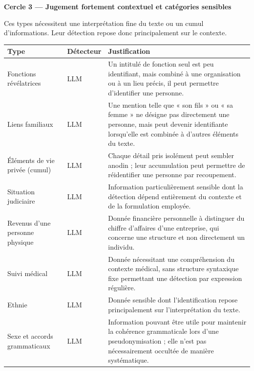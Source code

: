 \documentclass[12pt,a4paper]{article}
\begin{document}
\medskip
\noindent\textbf{Cercle 3 --- Jugement fortement contextuel et catégories sensibles}

\smallskip

Ces types nécessitent une interprétation fine du texte ou un cumul
d'informations. Leur détection repose donc principalement sur le contexte.

\begin{longtable}{
    p{3.2cm}
    @{\hspace{0.4cm}}
    p{1.8cm}
    @{\hspace{0.4cm}}
    p{8.5cm}
}
\toprule
\textbf{Type} & \textbf{Détecteur} & \textbf{Justification} \\
\midrule
\endhead

Fonctions révélatrices
& LLM
& Un intitulé de fonction seul est peu identifiant, mais combiné à une
organisation ou à un lieu précis, il peut permettre d'identifier une personne. \\

Liens familiaux
& LLM
& Une mention telle que « son fils » ou « sa femme » ne désigne pas directement
une personne, mais peut devenir identifiante lorsqu'elle est combinée à
d'autres éléments du texte. \\

Éléments de vie privée (cumul)
& LLM
& Chaque détail pris isolément peut sembler anodin ; leur accumulation peut
permettre de réidentifier une personne par recoupement. \\

Situation judiciaire
& LLM
& Information particulièrement sensible dont la détection dépend entièrement
du contexte et de la formulation employée. \\

Revenus d'une personne physique
& LLM
& Donnée financière personnelle à distinguer du chiffre d'affaires d'une
entreprise, qui concerne une structure et non directement un individu. \\

Suivi médical
& LLM
& Donnée nécessitant une compréhension du contexte médical, sans structure
syntaxique fixe permettant une détection par expression régulière. \\

Ethnie
& LLM
& Donnée sensible dont l'identification repose principalement sur
l'interprétation du texte. \\

Sexe et accords grammaticaux
& LLM
& Information pouvant être utile pour maintenir la cohérence grammaticale lors
d'une pseudonymisation ; elle n'est pas nécessairement occultée de manière
systématique. \\

\bottomrule
\end{longtable}
\end{document}

